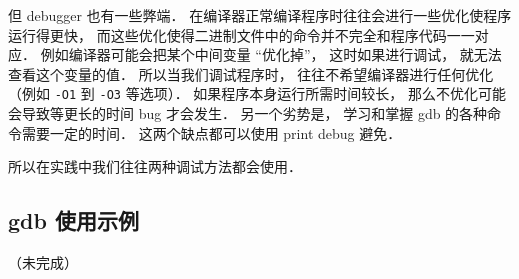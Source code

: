 但 debugger 也有一些弊端． 在编译器正常编译程序时往往会进行一些优化使程序运行得更快， 而这些优化使得二进制文件中的命令并不完全和程序代码一一对应． 例如编译器可能会把某个中间变量 “优化掉”， 这时如果进行调试， 就无法查看这个变量的值． 所以当我们调试程序时， 往往不希望编译器进行任何优化（例如 \verb|-O1| 到 \verb|-O3| 等选项）． 如果程序本身运行所需时间较长， 那么不优化可能会导致等更长的时间 bug 才会发生． 另一个劣势是， 学习和掌握 gdb 的各种命令需要一定的时间． 这两个缺点都可以使用 print debug 避免．

所以在实践中我们往往两种调试方法都会使用．

\subsection{gdb 使用示例}

（未完成）
